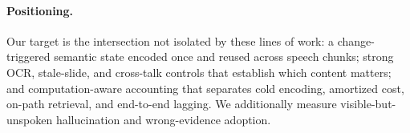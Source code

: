 \paragraph{Positioning.}
Our target is the intersection not isolated by these lines of work: a
change-triggered semantic state encoded once and reused across speech chunks;
strong OCR, stale-slide, and cross-talk controls that establish which content
matters; and computation-aware accounting that separates cold encoding,
amortized cost, on-path retrieval, and end-to-end lagging. We additionally
measure visible-but-unspoken hallucination and wrong-evidence adoption.
